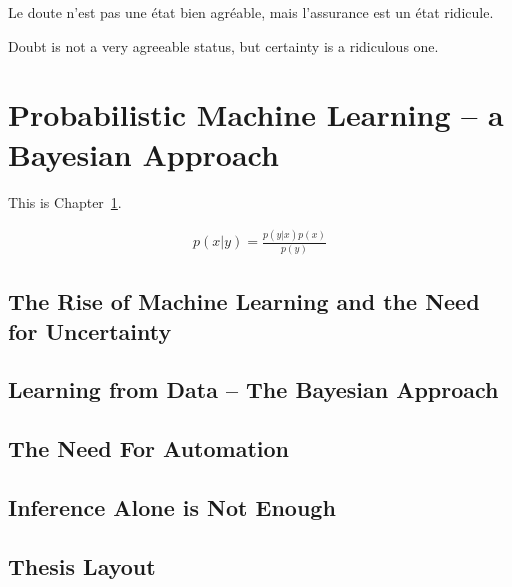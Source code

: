 
\begin{savequote}[8cm]
	\textlatin{Le doute n'est pas une état bien agréable, mais l'assurance est un état ridicule.}
	
	Doubt is not a very agreeable status, but certainty is a ridiculous one.
\end{savequote}

\chapter{Probabilistic Machine Learning -- a Bayesian Approach}
\label{sec:intro}

This is Chapter~\ref{sec:intro}.

\begin{align}
\label{eq:bayes}
p(x|y) = \frac{p(y|x)p(x)}{p(y)}
\end{align}


\section{The Rise of Machine Learning and the Need for Uncertainty}

\section{Learning from Data -- The Bayesian Approach}

\section{The Need For Automation}

\section{Inference Alone is Not Enough}

\section{Thesis Layout}